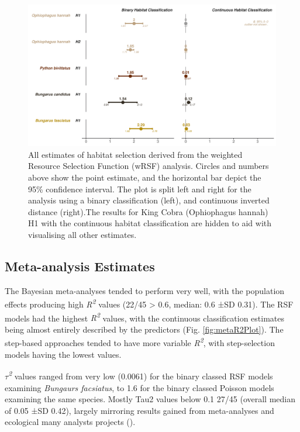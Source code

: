 \documentclass[10pt,a4paper]{article}
\begin{document}
\begin{figure}
\includegraphics[width=1\linewidth]{../../figures/specCurve_wrsf} \caption{All estimates of habitat selection derived from the weighted Resource Selection Function (wRSF) analysis. Circles and numbers above show the point estimate, and the horizontal bar depict the 95\% confidence interval. The plot is split left and right for the analysis using a binary classification (left), and continuous inverted distance (right).The results for King Cobra (Ophiophagus hannah) H1 with the continuous habitat classification are hidden to aid with visualising all other estimates.}\label{fig:specCurveWrsf}
\end{figure}

\subsection{Meta-analysis Estimates}\label{meta-analysis-estimates}

The Bayesian meta-analyses tended to perform very well, with the population effects producing high \emph{R\textsuperscript{2}} values (22/45 \textgreater{} 0.6, median: 0.6 ±SD 0.31).
The RSF models had the highest \emph{R\textsuperscript{2}} values, with the continuous classification estimates being almost entirely described by the predictors (Fig. \ref{fig:metaR2Plot}).
The step-based approaches tended to have more variable \emph{R\textsuperscript{2}}, with step-selection models having the lowest values.

\emph{\(\tau\)\textsuperscript{2}} values ranged from very low (0.0061) for the binary classed RSF models examining \emph{Bungaurs facsiatus}, to 1.6 for the binary classed Poisson models examining the same species.
Mostly Tau2 values below 0.1 27/45 (overall median of 0.05 ±SD 0.42), largely mirroring results gained from meta-analyses and ecological many analysts projects ().
\end{document}
